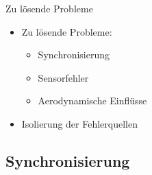 \documentclass[ucs,9pt]{beamer}
\begin{document}
\begin{frame}{Zu lösende Probleme}
	\begin{itemize}
		\item<1-> Zu lösende Probleme:
		\begin{itemize}
			\item<2-> Synchronisierung
			\item<3-> Sensorfehler
			\item<4-> Aerodynamische Einflüsse
		\end{itemize}
	\end{itemize}
	\begin{itemize}
		\item<6-> \alert{Isolierung der Fehlerquellen}
	\end{itemize}
\end{frame}

\subsection{Synchronisierung}
\end{document}
